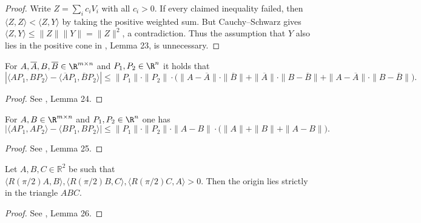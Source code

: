 \begin{proof}
\leanok
Write $Z=\sum_i c_iV_i$ with all $c_i>0$. If every claimed inequality failed,
then $\langle Z,Z\rangle<\langle Z,Y\rangle$ by taking the positive weighted sum.
But Cauchy--Schwarz gives
$\langle Z,Y\rangle\leq\|Z\|\|Y\|=\|Z\|^2$, a contradiction.
Thus the assumption that $Y$ also lies in the positive cone in
\cite{polyhedron.without.rupert}, Lemma 23, is unnecessary.
\end{proof}

\begin{lemma} \label{lem:scalarprodbars}
\leanok
    For $A,\overline{A},B,\overline{B}\in \R^{m\times n}$ and $P_1,P_2\in \R^n$ it holds that
    \[
        |\langle AP_1,BP_2\rangle-\langle \overline{A}P_1,\overline{B}P_2\rangle|\leq \|P_1\|\cdot \|P_2\|\cdot \Big( \|A-\overline{A}\|\cdot \|\overline{B}\| +  \|\overline{A}\|\cdot \|B-\overline{B}\|+\|A-\overline{A}\|\cdot \|B-\overline{B}\|\Big).
    \]
\end{lemma}

\begin{proof}
\leanok
See \cite{polyhedron.without.rupert}, Lemma 24.
\end{proof}

\begin{lemma} \label{lem:absscalar}
\leanok
    For $A,B\in \R^{m\times n}$ and $P_1,P_2\in \R^n$ one has
    $$|\langle AP_1,AP_2\rangle-\langle BP_1,BP_2\rangle|\leq \|P_1\|\cdot \|P_2\|\cdot \|A-B\|\cdot \bigg(\|A\|+\|B\| + \|A-B\|\bigg).$$
\end{lemma}

\begin{proof}
\leanok
See \cite{polyhedron.without.rupert}, Lemma 25.
\end{proof}

\begin{lemma} \label{lem:origintriangle}
\leanok
    Let $A,B,C\in \mathbb{R}^2$ be such that $
    \langle R({\pi/2}) A,B\rangle,
    \langle R({\pi/2}) B,C\rangle,
    \langle R({\pi/2}) C,A\rangle >0$. Then the origin lies strictly in the triangle $ABC$.
\end{lemma}

\begin{proof}
\leanok
See \cite{polyhedron.without.rupert}, Lemma 26.
\end{proof}

